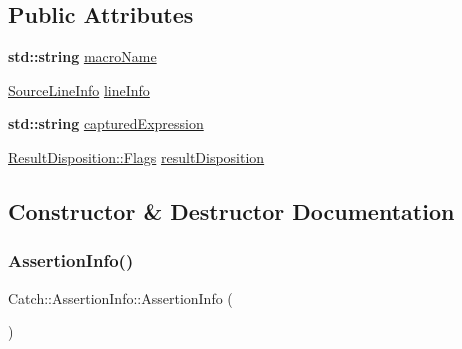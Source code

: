 \subsection*{Public Attributes}
\begin{DoxyCompactItemize}
\item 
\textbf{ std\+::string} \hyperlink{struct_catch_1_1_assertion_info_ac2e59e8c89e00eb3390768f50d540b18}{macro\+Name}
\item 
\hyperlink{struct_catch_1_1_source_line_info}{Source\+Line\+Info} \hyperlink{struct_catch_1_1_assertion_info_a17bdbb404ba12658034f833be2f4c3e7}{line\+Info}
\item 
\textbf{ std\+::string} \hyperlink{struct_catch_1_1_assertion_info_af7c1d3cbfa346e9a303030fa0ef0cb54}{captured\+Expression}
\item 
\hyperlink{struct_catch_1_1_result_disposition_a3396cad6e2259af326b3aae93e23e9d8}{Result\+Disposition\+::\+Flags} \hyperlink{struct_catch_1_1_assertion_info_a60353b3632ab2f827162f2b2d6911073}{result\+Disposition}
\end{DoxyCompactItemize}


\subsection{Constructor \& Destructor Documentation}
\mbox{\label{struct_catch_1_1_assertion_info_a15c29d306c86361f842a0351a6003b9f}} 
\subsubsection{\texorpdfstring{Assertion\+Info()}{AssertionInfo()}\hspace{0.1cm}{\footnotesize\ttfamily [1/2]}}
{\footnotesize\ttfamily Catch\+::\+Assertion\+Info\+::\+Assertion\+Info (\begin{DoxyParamCaption}{ }\end{DoxyParamCaption})\hspace{0.3cm}{\ttfamily [inline]}}

\mbox{\label{struct_catch_1_1_assertion_info_aaf6cc3eebd40391e54d37ed42953c73f}} 
